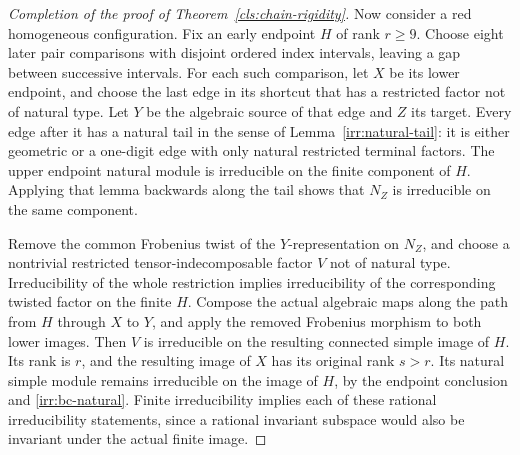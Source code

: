 \begin{proof}[Completion of the proof of Theorem~\ref{cls:chain-rigidity}]
Now consider a red homogeneous configuration.  Fix an early endpoint $H$
of rank $r\geq9$.  Choose eight later pair comparisons with disjoint ordered
index intervals, leaving a gap between successive intervals.
For each such comparison, let $X$ be its lower endpoint, and choose the
last edge in its shortcut that has a restricted factor not of natural
type.  Let $Y$ be the algebraic source of that edge and $Z$ its target.
Every edge after it has a natural tail in the sense of
Lemma~\ref{irr:natural-tail}: it is either geometric or a one-digit edge
with only natural restricted terminal factors.
The upper endpoint natural module is irreducible on the finite component
of $H$.  Applying that lemma backwards along the tail shows that $N_Z$
is irreducible on the same component.

Remove the common Frobenius twist of the $Y$-representation on $N_Z$,
and choose a nontrivial restricted tensor-indecomposable factor $V$ not
of natural type.  Irreducibility of the whole restriction implies
irreducibility of the corresponding twisted factor on the finite $H$.
Compose the actual algebraic maps along the path from $H$ through $X$
to $Y$, and apply the removed Frobenius morphism to both lower images.
Then $V$ is irreducible on the resulting connected simple image of $H$.
Its rank is $r$, and the resulting image of $X$ has its original rank
$s>r$.  Its natural simple module remains irreducible on the image of
$H$, by the endpoint conclusion and \eqref{irr:bc-natural}.
Finite irreducibility implies each of these rational irreducibility
statements, since a rational invariant subspace would also be invariant
under the actual finite image.


\end{proof}
